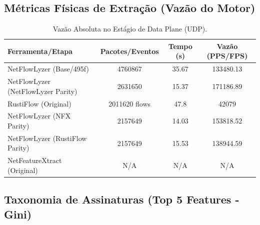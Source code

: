 \documentclass[11pt,a4paper]{article}
\begin{document}
\subsection{Métricas Físicas de Extração (Vazão do Motor)}
\begin{table}[H]
\centering
\begin{threeparttable}
\begin{tabular}{lccc}
\toprule
\textbf{Ferramenta/Etapa} & \textbf{Pacotes/Eventos} & \textbf{Tempo (s)} & \textbf{Vazão (PPS/FPS)} \\
\midrule
NetFlowLyzer (Base/495f) & 4760867 & 35.67 & 133480.13 \\
NetFlowLyzer (NetFlowLyzer Parity) & 2631650 & 15.37 & 171186.89 \\
RustiFlow (Original) & 2011620 flows & 47.8 & 42079 \\
NetFlowLyzer (NFX Parity) & 2157649 & 14.03 & 153818.52 \\
NetFlowLyzer (RustiFlow Parity) & 2157649 & 15.53 & 138944.59 \\
NetFeatureXtract (Original) & N/A & N/A & N/A \\
\bottomrule
\end{tabular}
\end{threeparttable}
\caption{Vazão Absoluta no Estágio de Data Plane (UDP).}
\end{table}

\subsection{Taxonomia de Assinaturas (Top 5 Features - Gini)}
\begin{table}[H]
\centering
{}
\caption{Principais atributos de correlação estocástica por limiar dimensional (UDP).}
\end{table}
\end{document}
